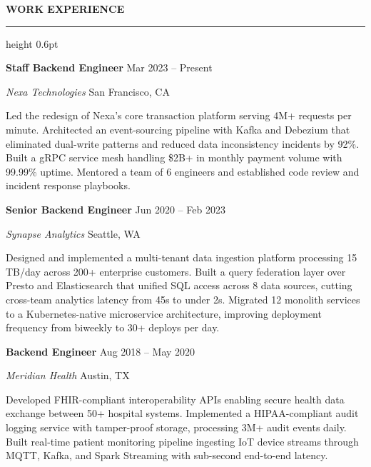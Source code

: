 \documentclass[11pt,a4paper]{article}
\newcommand{\tsection}[1]{%
  \vspace{6pt}
  {\large\bfseries\color{terminalDark}#1}
  \vspace{2pt}
  \hrule height 0.6pt
  \vspace{4pt}
}
\newcommand{\jobentry}[5]{%
  \vspace{3pt}
  {\bfseries\color{terminalDark}#1} \hfill {\color{terminalGray}\footnotesize\faCalendar\enspace#2}\par
  {\color{terminalGreen}\itshape#3} \hfill {\color{terminalGray}\footnotesize\faMapMarker\enspace#4}\par
  \vspace{2pt}
  #5\par
}
\begin{document}
\begin{minipage}[t]{0.58\textwidth}
\tsection{WORK EXPERIENCE}

\jobentry{Staff Backend Engineer}{Mar 2023 -- Present}{Nexa Technologies}{San Francisco, CA}{%
  Led the redesign of Nexa's core transaction platform serving 4M+ requests per minute. Architected an event-sourcing pipeline with Kafka and Debezium that eliminated dual-write patterns and reduced data inconsistency incidents by 92\%. Built a gRPC service mesh handling \$2B+ in monthly payment volume with 99.99\% uptime. Mentored a team of 6 engineers and established code review and incident response playbooks.
}

\vspace{4pt}

\jobentry{Senior Backend Engineer}{Jun 2020 -- Feb 2023}{Synapse Analytics}{Seattle, WA}{%
  Designed and implemented a multi-tenant data ingestion platform processing 15 TB/day across 200+ enterprise customers. Built a query federation layer over Presto and Elasticsearch that unified SQL access across 8 data sources, cutting cross-team analytics latency from 45s to under 2s. Migrated 12 monolith services to a Kubernetes-native microservice architecture, improving deployment frequency from biweekly to 30+ deploys per day.
}

\vspace{4pt}

\jobentry{Backend Engineer}{Aug 2018 -- May 2020}{Meridian Health}{Austin, TX}{%
  Developed FHIR-compliant interoperability APIs enabling secure health data exchange between 50+ hospital systems. Implemented a HIPAA-compliant audit logging service with tamper-proof storage, processing 3M+ audit events daily. Built real-time patient monitoring pipeline ingesting IoT device streams through MQTT, Kafka, and Spark Streaming with sub-second end-to-end latency.
}

\end{minipage}
\hfill
\end{document}
